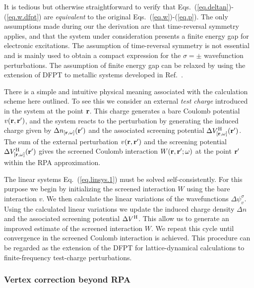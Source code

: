 \documentclass[twocolumn,prb,showpacs,superscriptaddress]{revtex4}
\def\w{\omega}
\def\s{\sigma}
\def\r{{\bf r}}
\def\rp{{\bf r^\prime}}
\begin{document}
It is tedious but otherwise straightforward to verify that 
Eqs.\ (\ref{eq.deltan})-(\ref{eq.w.dfpt}) are {\it equivalent} to the 
original Eqs.\ (\ref{eq.w})-(\ref{eq.p}).
The only assumptions made during our the derivation are that 
time-reversal symmetry applies,
and that the system under consideration presents a finite 
energy gap for electronic excitations. 
The assumption of time-reversal symmetry is not essential and is mainly used to
obtain a compact expression for the $\sigma=\pm$ wavefunction perturbations.
The assumption of finite energy gap can be relaxed by using the extension
of DFPT to metallic systems developed in Ref.\ . 


There is a simple and intuitive physical meaning associated with 
the calculation scheme here outlined. To see this
we consider an external {\it test charge} introduced in the system
at the point $\r$. This charge generates a bare Coulomb potential $v(\r,\rp)$,
and the system reacts to the perturbation by generating the induced charge
given by $\Delta n_{[\r,\w]}(\rp)$ and the associated 
screening potential $\Delta V^{\rm H}_{[\r,\w]}(\rp)$.
The sum of the external perturbation $v(\r,\rp)$ and the screening
potential $\Delta V^{\rm H}_{[\r,\w]}(\rp)$ gives the screened Coulomb
interaction $W(\r,\rp;\w)$ at the point $\rp$ within the RPA approximation.

The linear systems Eq.\ (\ref{eq.linsys.1}) must be solved self-consistently.
For this purpose we begin by initializing the screened
interaction $W$ using the bare interaction $v$. 
We then calculate the linear variations of the wavefunctions $\Delta \psi_v^\sigma$.
Using the calculated linear variations we update the induced charge density $\Delta n$
and the associated screening potential $\Delta V^{\rm H}$. This allow us to
generate an improved estimate of the screened interaction $W$.
We repeat this cycle until convergence in the screened Coulomb
interaction is achieved. This procedure can be regarded as the extension
of the DFPT for lattice-dynamical calculations to finite-frequency
test-charge perturbations. 

\subsubsection{Vertex correction beyond RPA}
\end{document}
